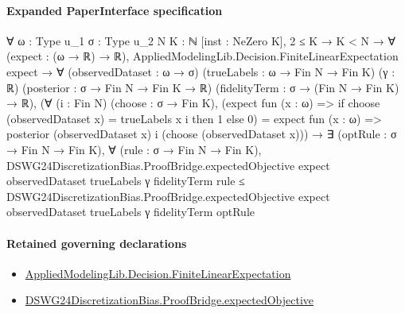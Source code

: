 \documentclass[10pt]{article}
\begin{document}
\paragraph{Expanded PaperInterface specification}
\begin{ReviewVerbatim}
∀ {ω : Type u_1} {σ : Type u_2} {N K : ℕ} [inst : NeZero K],
  2 ≤ K →
    K < N →
      ∀ (expect : (ω → ℝ) → ℝ),
        AppliedModelingLib.Decision.FiniteLinearExpectation expect →
          ∀ (observedDataset : ω → σ) (trueLabels : ω → Fin N → Fin K) (γ : ℝ) (posterior : σ → Fin N → Fin K → ℝ)
            (fidelityTerm : σ → (Fin N → Fin K) → ℝ),
            (∀ (i : Fin N) (choose : σ → Fin K),
                (expect fun (x : ω) => if choose (observedDataset x) = trueLabels x i then 1 else 0) =
                  expect fun (x : ω) => posterior (observedDataset x) i (choose (observedDataset x))) →
              ∃ (optRule : σ → Fin N → Fin K),
                ∀ (rule : σ → Fin N → Fin K),
                  DSWG24DiscretizationBias.ProofBridge.expectedObjective expect observedDataset trueLabels γ
                      fidelityTerm rule ≤
                    DSWG24DiscretizationBias.ProofBridge.expectedObjective expect observedDataset trueLabels γ
                      fidelityTerm optRule
\end{ReviewVerbatim}

\paragraph{Retained governing declarations}
\begin{itemize}\raggedright
\item \hyperlink{governing-declaration-443446486047239c}{Applied\allowbreak{}Modeling\allowbreak{}Lib.\allowbreak{}Decision.\allowbreak{}Finite\allowbreak{}Linear\allowbreak{}Expectation}
\item \hyperlink{governing-declaration-8e0892ece8e4e41c}{DSWG24\allowbreak{}Discretization\allowbreak{}Bias.\allowbreak{}Proof\allowbreak{}Bridge.\allowbreak{}expected\allowbreak{}Objective}
\end{itemize}
\end{document}
